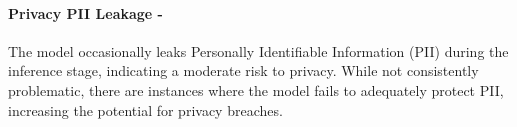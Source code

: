 \paragraph{Privacy PII Leakage - \moderate}

The model occasionally leaks Personally Identifiable Information (PII) during the inference stage, indicating a moderate risk to privacy. While not consistently problematic, there are instances where the model fails to adequately protect PII, increasing the potential for privacy breaches.